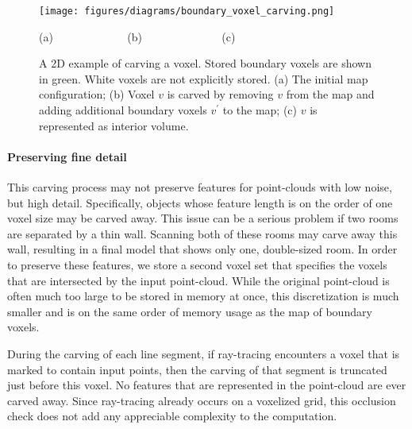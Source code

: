 \documentclass[10pt,twocolumn,letterpaper]{article}
\begin{document}
\begin{figure}[t]

  \centerline{\texttt{[image: figures/diagrams/boundary\_voxel\_carving.png]}}
  \centerline{(a)\,\,\,\,\,\,\,\,\,\,\,\,\,\,\,\,\,\,\,\,\,\,\,\,\,\,\,\,\,\,\,\,\,\,\,\,\,\,\,\,(b)\,\,\,\,\,\,\,\,\,\,\,\,\,\,\,\,\,\,\,\,\,\,\,\,\,\,\,\,\,\,\,\,\,\,\,\,\,\,\,\,\,\,\,(c)\,\,\,\,\,}
\caption{A 2D example of carving a voxel.  Stored boundary voxels are shown in green.  White voxels are not explicitly stored. (a) The initial map configuration; (b) Voxel $v$ is carved by removing $v$ from the map and adding additional boundary voxels $v^{\prime}$ to the map; (c) $v$ is represented as interior volume.}
\label{fig:boundary_carving}
\end{figure}




\paragraph*{Preserving fine detail}

This carving process may not preserve features for point-clouds with low noise, but high detail.  Specifically, objects whose feature length is on the order of one voxel size may be carved away.  This issue can be a serious problem if two rooms are separated by a thin wall.  Scanning both of these rooms may carve away this wall, resulting in a final model that shows only one, double-sized room.  In order to preserve these features, we store a second voxel set that specifies the voxels that are intersected by the input point-cloud.  While the original point-cloud is often much too large to be stored in memory at once, this discretization is much smaller and is on the same order of memory usage as the map of boundary voxels.

During the carving of each line segment, if ray-tracing encounters a voxel that is marked to contain input points, then the carving of that segment is truncated just before this voxel.  No features that are represented in the point-cloud are ever carved away.  Since ray-tracing already occurs on a voxelized grid, this occlusion check does not add any appreciable complexity to the computation.
\end{document}
